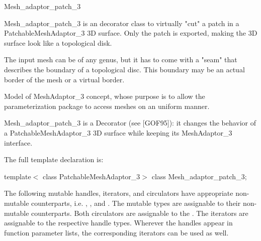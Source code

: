 

\begin{ccRefClass}{Mesh_adaptor_patch_3}  %


\ccDefinition


Mesh\_adaptor\_patch\_3 is an decorator class to virtually "cut" a patch in a PatchableMeshAdaptor\_3 3D surface. Only the patch is exported, making the 3D surface look like a topological disk.

The input mesh can be of any genus, but it has to come with a "seam" that describes the boundary of a topological disc. This boundary may be an actual border of the mesh or a virtual border.



\ccIsModel

Model of MeshAdaptor\_3 concept, whose purpose is to allow the parameterization package to access meshes on an uniform manner.



Mesh\_adaptor\_patch\_3 is a Decorator (see [GOF95]): it changes the behavior of a PatchableMeshAdaptor\_3 3D surface while keeping its MeshAdaptor\_3 interface.



\ccParameters

The full template declaration is:

template$<$
class PatchableMeshAdaptor\_3$>$ 
class Mesh\_adaptor\_patch\_3;


\ccTypes

The following mutable handles, iterators, and circulators have appropriate
non-mutable counterparts, i.e. ,
, and . The mutable types are
assignable to their non-mutable counterparts.  Both circulators are
assignable to the . The iterators are
assignable to the respective handle types. Wherever the handles appear
in function parameter lists, the corresponding iterators can be used as
well.


\end{ccRefClass}
